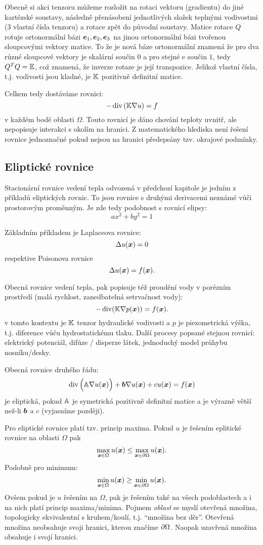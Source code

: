 Obecně si akci tenzoru můžeme rozložit na rotaci vektoru (gradientu) do jiné kartézské soustavy, 
následně přenásobení jednotlivých složek teplnými vodivostmi (3 vlastní čísla tenzoru)
a rotace zpět do původní soustavy. Matice rotace $Q$ rotuje ortonormální bázi 
$\mathbf{\boldsymbol{e}}_1, \mathbf{\boldsymbol{e}}_2, \mathbf{\boldsymbol{e}}_3$ na jinou ortonormální bázi tvořenou sloupcovými vektory matice.
To že je nová báze ortonormální znamená že pro dva různé sloupcové vektory je skalární 
součin $0$ a pro stejné e součin $1$, tedy  $Q^TQ = {\mathbb{E}}$, což znamená, že 
inverze rotaze je její transpozice. Jelikož vlastní čísla, t.j. vodivosti 
jsou kladné, je ${\mathbb{K}}$ pozitivně definitní matice.

Celkem tedy dostáváme rovnici:
\[
    - \operatorname{div}\left( {\mathbb{K}} \nabla u \right) = f  
\]
v každém bodě oblasti $\Omega$. Touto rovnicí je dáno chování teploty uvnitř, 
ale nepopisuje interakci s okolím na hranici. Z matematického hlediska není řešení 
rovnice jednoznačné pokud nejsou na hranici předepsány tzv. okrajové podmínky.



\subsection{Eliptické rovnice}
Stacionární rovnice vedení tepla odvozená v předchozí kapitole je jedním z příkladů 
eliptických rovnic. To jsou rovnice s druhými derivacemi neznámé vůči prostorovým proměnným.
Je zde tedy podobnost s rovnicí elipsy:
\[
    ax^2 + by^2 = 1
\]


Základním příkladem je Laplaceova rovnice:
\[
    \Delta u(\mathbf{\boldsymbol{x}}) = 0
\]
respektive Poisonova rovnice
\[
    \Delta u(\mathbf{\boldsymbol{x}}) = f(\mathbf{\boldsymbol{x}}).
\]

Obecná rovnice vedení tepla, pak popisuje též proudění vody v porézním prostředí 
(malá rychlost, zanedbatelná setrvačnost vody):
\[
   - \operatorname{div}( {\mathbb{K}} \nabla p(\mathbf{\boldsymbol{x}})) = f(\mathbf{\boldsymbol{x}}).
\]
v tomto kontextu je ${\mathbb{K}}$ tenzor hydraulické vodivosti a $p$ je piezometrická výška, t.j. 
diference vůču hydrostatickému tlaku. Další procesy popsané stejnou rovnicí: elektrický potenciál, 
difúze / disperze látek, jednoduchý model průhybu nosníku/desky.


Obecná rovnice druhého řádu:
\[
  \operatorname{div}\Big( {\mathbb{A}} \nabla u(\mathbf{\boldsymbol{x}})\Big) + \mathbf{\boldsymbol{b}} \nabla u(\mathbf{\boldsymbol{x}}) + c u(\mathbf{\boldsymbol{x}})= f(\mathbf{\boldsymbol{x}})
\]
je eliptická, pokud ${\mathbb{A}}$ je symetrická pozitivně definitní matice 
a je výrazně větší než-li $\mathbf{\boldsymbol{b}}$ a $c$ (vyjasníme později).

Pro eliptické rovnice platí tzv. princip maxima. 
Pokud $u$ je řešením eplitické rovnice na oblasti $\Omega$
pak 
\[
    \max_{\mathbf{\boldsymbol{x}} \in \Omega} u(\mathbf{\boldsymbol{x}}) \le \max_{\mathbf{\boldsymbol{x}} \in \partial \Omega}  u(\mathbf{\boldsymbol{x}}).
\]
Podobně pro minimum:
\[
    \min_{\mathbf{\boldsymbol{x}} \in \Omega} u(\mathbf{\boldsymbol{x}}) \ge \min_{\mathbf{\boldsymbol{x}} \in \partial \Omega}  u(\mathbf{\boldsymbol{x}}).
\]
Ovšem pokud je $u$ řešením na $\Omega$, pak je řešením také na všech 
podoblastech a i na nich platí princip maxima/minima. Pojmem {\it oblast}
se myslí otevřená množina, topologicky ekvivalentní s kruhem/koulí, t.j. ``množina bez děr''.
Otevřená množina neobsahuje svoji hranici, kterou značíme $\partial \Omega$. 
Naopak uzavřená množina obsahuje i svojí hranici. 


